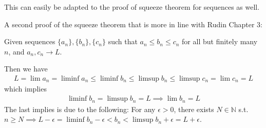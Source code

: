 \documentclass{article}
\begin{document}
This can easily be adapted to the proof of squeeze theorem for sequences as well.

A second proof of the squeeze theorem that is more in line with Rudin Chapter 3:

Given sequences $\{a_n\}, \{b_n\}, \{c_n\}$ such that $a_n\leq b_n\leq c_n$ for all but finitely many $n$, and $a_n, c_n\rightarrow L$.

Then we have \begin{align*}
	L = \lim a_n = \liminf a_n \leq \liminf b_n \leq \limsup b_n \leq \limsup c_n = \lim c_n = L
\end{align*}
which implies
\begin{align*}
	\liminf b_n = \limsup b_n = L \implies \lim b_n = L
\end{align*}
The last implies is due to the following: For any $\epsilon > 0$, there exists $N \in \mathbb{N}$ s.t. $n\geq N\implies L - \epsilon = \liminf b_n - \epsilon < b_n < \limsup b_n + \epsilon = L + \epsilon$.
\end{document}
